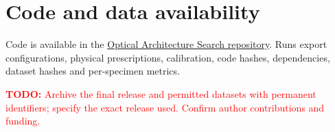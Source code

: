\documentclass[11pt]{article}
\newcommand{\todo}[1]{\par\noindent\textcolor{red}{\textbf{TODO:} #1}\par}
\begin{document}
\section*{Code and data availability}
Code is available in the
\href{https://github.com/Le0nZim/optical-architecture-search}{Optical Architecture Search repository}.
Runs export configurations, physical prescriptions, calibration, code hashes,
dependencies, dataset hashes and per-specimen metrics.
\todo{Archive the final release and permitted datasets with permanent identifiers;
specify the exact release used. Confirm author contributions and funding.}


\end{document}
